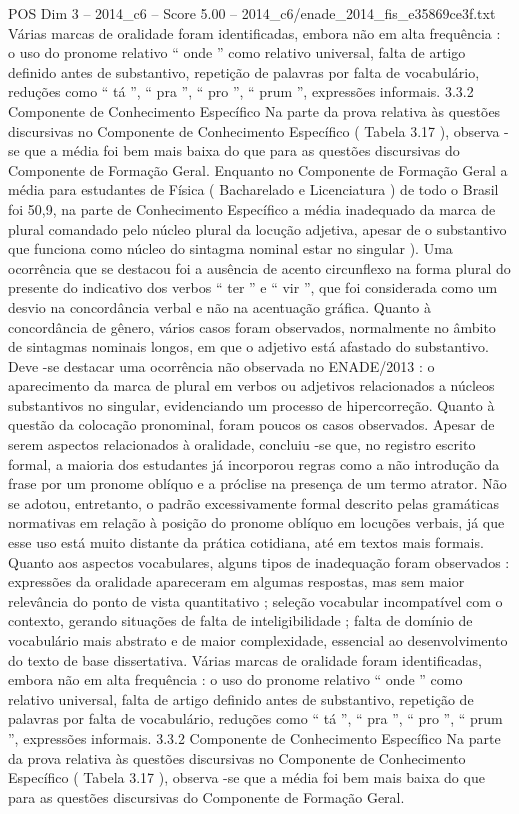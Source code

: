 \begin{textsample}{POS Dim 3 – 2014\_c6 – Score 5.00 – 2014\_c6/enade\_2014\_fis\_e35869ce3f.txt}
Várias marcas de oralidade foram identificadas, embora não em alta frequência : o uso do pronome relativo “ onde ” como relativo universal, falta de artigo definido antes de substantivo, repetição de palavras por falta de vocabulário, reduções como “ tá ”, “ pra ”, “ pro ”, “ prum ”, expressões informais. 3.3.2 Componente de Conhecimento Específico Na parte da prova relativa às questões discursivas no Componente de Conhecimento Específico ( Tabela 3.17 ), observa -se que a média foi bem mais baixa do que para as questões discursivas do Componente de Formação Geral.
Enquanto no Componente de Formação Geral a média para estudantes de Física ( Bacharelado e Licenciatura ) de todo o Brasil foi 50,9, na parte de Conhecimento Específico a média inadequado da marca de plural comandado pelo núcleo plural da locução adjetiva, apesar de o substantivo que funciona como núcleo do sintagma nominal estar no singular ).
Uma ocorrência que se destacou foi a ausência de acento circunflexo na forma plural do presente do indicativo dos verbos “ ter ” e “ vir ”, que foi considerada como um desvio na concordância verbal e não na acentuação gráfica.
Quanto à concordância de gênero, vários casos foram observados, normalmente no âmbito de sintagmas nominais longos, em que o adjetivo está afastado do substantivo.
Deve -se destacar uma ocorrência não observada no ENADE/2013 : o aparecimento da marca de plural em verbos ou adjetivos relacionados a núcleos substantivos no singular, evidenciando um processo de hipercorreção.
Quanto à questão da colocação pronominal, foram poucos os casos observados.
Apesar de serem aspectos relacionados à oralidade, concluiu -se que, no registro escrito formal, a maioria dos estudantes já incorporou regras como a não introdução da frase por um pronome oblíquo e a próclise na presença de um termo atrator.
Não se adotou, entretanto, o padrão excessivamente formal descrito pelas gramáticas normativas em relação à posição do pronome oblíquo em locuções verbais, já que esse uso está muito distante da prática cotidiana, até em textos mais formais.
Quanto aos aspectos vocabulares, alguns tipos de inadequação foram observados : expressões da oralidade apareceram em algumas respostas, mas sem maior relevância do ponto de vista quantitativo ; seleção vocabular incompatível com o contexto, gerando situações de falta de inteligibilidade ; falta de domínio de vocabulário mais abstrato e de maior complexidade, essencial ao desenvolvimento do texto de base dissertativa.
Várias marcas de oralidade foram identificadas, embora não em alta frequência : o uso do pronome relativo “ onde ” como relativo universal, falta de artigo definido antes de substantivo, repetição de palavras por falta de vocabulário, reduções como “ tá ”, “ pra ”, “ pro ”, “ prum ”, expressões informais. 3.3.2 Componente de Conhecimento Específico Na parte da prova relativa às questões discursivas no Componente de Conhecimento Específico ( Tabela 3.17 ), observa -se que a média foi bem mais baixa do que para as questões discursivas do Componente de Formação Geral.

\end{textsample}
